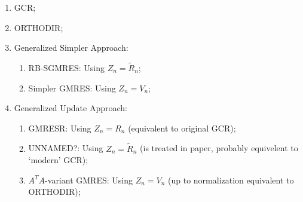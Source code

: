 \documentclass[a4paper,dutch,reqno]{article}
\theoremstyle{plain}
\theoremstyle{definition}
\begin{document}

\begin{enumerate}
\item GCR;
\item ORTHODIR;
\item Generalized Simpler Approach:
\begin{enumerate}
\item RB-SGMRES: Using \(Z_n = \tilde{R}_n\);
\item Simpler GMRES: Using \(Z_n = V_n\);
\end{enumerate}
\item Generalized Update Approach:
\begin{enumerate}
\item GMRESR: Using \(Z_n = R_n\) (equivalent to original GCR);
\item UNNAMED?: Using \(Z_n = \tilde{R}_n\) (is treated in paper, probably equivelent to `modern' GCR);
\item \(A^TA\)-variant GMRES: Using \(Z_n = V_n\) (up to normalization equivalent to ORTHODIR);
\end{enumerate}
\end{enumerate}
\end{document}

